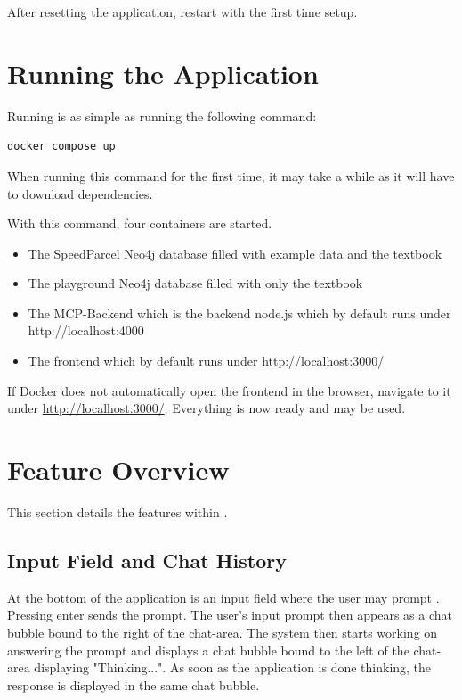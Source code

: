 After resetting the application, restart with the first time setup.

\section{Running the Application}
\label{appendix:instructions:running}
Running \prototype{} is as simple as running the following command:
\begin{lstlisting}[style=dockerstyle, label={lst:start_masuta}]
docker compose up
\end{lstlisting}

When running this command for the first time, it may take a while as it will have to download dependencies.

With this command, four containers are started.
\begin{itemize}
	\item The SpeedParcel Neo4j database filled with example data and the textbook
	\item The playground Neo4j database filled with only the textbook
	\item The MCP-Backend which is the backend node.js which by default runs under http://localhost:4000
	\item The frontend which by default runs under http://localhost:3000/
\end{itemize}

If Docker does not automatically open the frontend in the browser, navigate to it under \href{http://localhost:3000/}{http://localhost:3000/}. Everything is now ready and \prototype{} may be used.


\section{Feature Overview}
\label{appendix:instructions:features}
This section details the features within \prototype{}.

\subsection{Input Field and Chat History}
\label{appendix:instructions:input_and_chat}
At the bottom of the application is an input field where the user may prompt \prototype. Pressing enter sends the prompt. The user's input prompt then appears as a chat bubble bound to the right of the chat-area. The system then starts working on answering the prompt and displays a chat bubble bound to the left of the chat-area displaying "Thinking...". As soon as the application is done thinking, the response is displayed in the same chat bubble.

